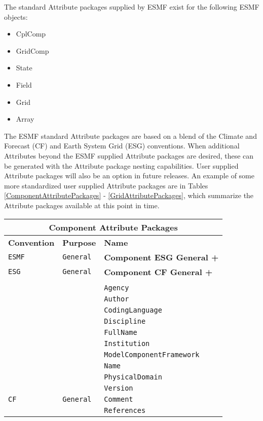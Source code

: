 The standard Attribute packages supplied by ESMF exist for the following ESMF objects:

\begin{itemize}
\item CplComp
\item GridComp
\item State
\item Field
\item Grid
\item Array
\end{itemize}

The ESMF standard Attribute packages are based on a blend of the Climate and Forecast (CF) and Earth System Grid (ESG) conventions.  When additional Attributes beyond the ESMF supplied Attribute packages are desired, these can be generated with the Attribute package nesting capabilities.  User supplied Attribute packages will also be an option in future releases.  An example of some more standardized user supplied Attribute packages are in Tables \ref{ComponentAttributePackages} - \ref{GridAttributePackages}, which summarize the Attribute packages available at this point in time.

\vspace{18pt}

\begin{tabular}{|p{4cm}|p{4cm}|p{6cm}|}
\hline
\multicolumn{3}{|c|}{{\bf \large Component Attribute Packages}} \\
\hline\hline
{\bf Convention} & {\bf Purpose} & {\bf Name} \\
\hline\hline
{\tt ESMF} & {\tt General} & {\bf Component ESG General +} \\
{\tt ESG} & {\tt General} & {\bf Component CF General +} \\
     & & \\
     & & {\tt Agency} \\
     & & {\tt Author} \\
     & & {\tt CodingLanguage}  \\
     & & {\tt Discipline}  \\
     & & {\tt FullName} \\
     & & {\tt Institution} \\
     & & {\tt ModelComponentFramework} \\
     & & {\tt Name} \\
     & & {\tt PhysicalDomain}\\
     & & {\tt Version} \\ 
\hline
{\tt CF} & {\tt General} & {\tt Comment}\\
     & & {\tt References} \\
\hline
\end{tabular}
\label{ComponentAttributePackages}

